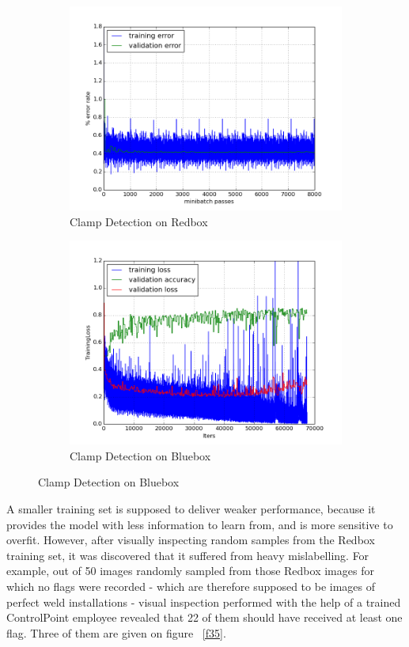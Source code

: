 \documentclass[a4paper,11pt]{article}
\begin{document}
\begin{figure}[h!]
	\centering
	\begin{subfigure}{.5\textwidth}
  		\centering
		\includegraphics[scale=0.4]{images/increase_test_precision.png}
		\caption{Clamp Detection on Redbox}
	\end{subfigure}%
	\begin{subfigure}{.5\textwidth}
  		\centering
		\includegraphics[scale=0.4]{images/plot_clampdet_tl_wout.png}
		\caption{Clamp Detection on Bluebox}
	\end{subfigure}
    \label{f34}
\end{figure}

A smaller training set is supposed to deliver weaker performance, because it provides the model with less information to learn from, and is more sensitive to overfit. However, after visually inspecting random samples from the Redbox training set, it was discovered that it suffered from heavy mislabelling. For example, out of 50 images randomly sampled from those Redbox images for which no flags were recorded - which are therefore supposed to be images of perfect weld installations - visual inspection performed with the help of a trained ControlPoint employee revealed that 22 of them should have received at least one flag. Three of them are given on figure ~\ref{f35}.
\end{document}

